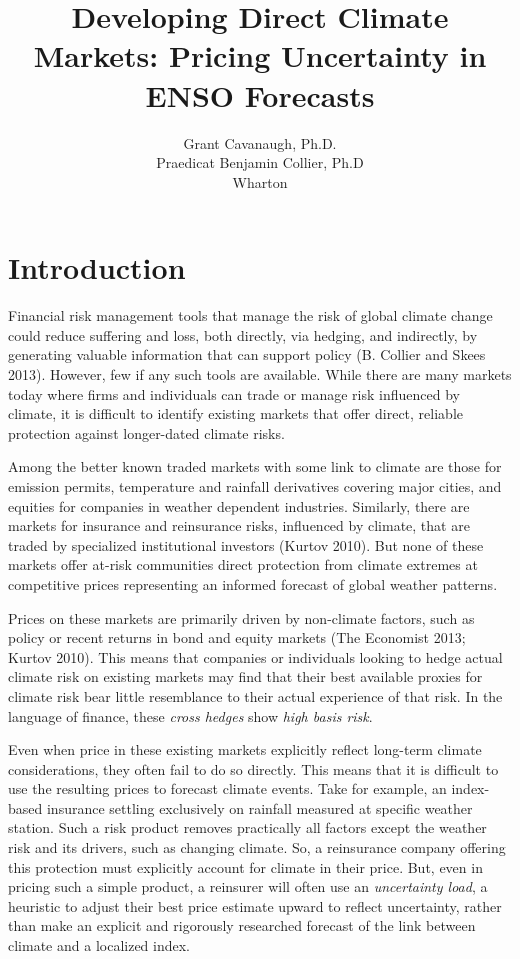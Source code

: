 \documentclass[article]{jss}
\author{
Grant Cavanaugh, Ph.D.\\Praedicat \And Benjamin Collier, Ph.D\\Wharton
}
\title{Developing Direct Climate Markets: Pricing Uncertainty in ENSO Forecasts}
\begin{document}
\section{Introduction}\label{introduction}

Financial risk management tools that manage the risk of global climate
change could reduce suffering and loss, both directly, via hedging, and
indirectly, by generating valuable information that can support policy
(B. Collier and Skees 2013). However, few if any such tools are
available. While there are many markets today where firms and
individuals can trade or manage risk influenced by climate, it is
difficult to identify existing markets that offer direct, reliable
protection against longer-dated climate risks.

Among the better known traded markets with some link to climate are
those for emission permits, temperature and rainfall derivatives
covering major cities, and equities for companies in weather dependent
industries. Similarly, there are markets for insurance and reinsurance
risks, influenced by climate, that are traded by specialized
institutional investors (Kurtov 2010). But none of these markets offer
at-risk communities direct protection from climate extremes at
competitive prices representing an informed forecast of global weather
patterns.

Prices on these markets are primarily driven by non-climate factors,
such as policy or recent returns in bond and equity markets (The
Economist 2013; Kurtov 2010). This means that companies or individuals
looking to hedge actual climate risk on existing markets may find that
their best available proxies for climate risk bear little resemblance to
their actual experience of that risk. In the language of finance, these
\emph{cross hedges} show \emph{high basis risk}.

Even when price in these existing markets explicitly reflect long-term
climate considerations, they often fail to do so directly. This means
that it is difficult to use the resulting prices to forecast climate
events. Take for example, an index-based insurance settling exclusively
on rainfall measured at specific weather station. Such a risk product
removes practically all factors except the weather risk and its drivers,
such as changing climate. So, a reinsurance company offering this
protection must explicitly account for climate in their price. But, even
in pricing such a simple product, a reinsurer will often use an
\emph{uncertainty load}, a heuristic to adjust their best price estimate
upward to reflect uncertainty, rather than make an explicit and
rigorously researched forecast of the link between climate and a
localized index.
\end{document}
